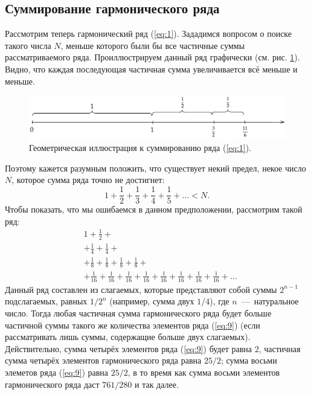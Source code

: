 \documentclass[12pt]{article}
\begin{document}
\subsection{Суммирование гармонического ряда}
Рассмотрим теперь гармонический ряд (\ref{eq:1}). Зададимся вопросом о поиске такого числа $N$, меньше которого были бы все частичные суммы рассматриваемого ряда. Проиллюстрируем данный ряд графически (см. рис. \ref{fig:2}). Видно, что каждая последующая частичная сумма увеличивается всё меньше и меньше.
\begin{figure}[ht]
    \centering
    \includegraphics[width = 1\textwidth]{fig2.png}
    \caption{Геометрическая иллюстрация к суммированию ряда (\ref{eq:1}).}
    \label{fig:2}
\end{figure}
Поэтому кажется разумным положить, что существует некий предел, некое число $N$, которое сумма ряда точно не достигнет:
\begin{equation}\label{eq:7}
    1 + \dfrac{1}{2} + \dfrac13 + \dfrac14 + \dfrac15 + \ldots < N.
\end{equation}
Чтобы показать, что мы ошибаемся в данном предположении, рассмотрим такой ряд:
\begin{equation}\label{eq:9}
    \begin{split}
        &1 + \tfrac12 +\\
        &+ \tfrac14 + \tfrac14 +\\
        &+ \tfrac18+ \tfrac18+ \tfrac18+ \tfrac18 +\\
        &+ \tfrac1{16}+ \tfrac1{16}+ \tfrac1{16}+ \tfrac1{16} + \tfrac1{16}+ \tfrac1{16}+ \tfrac1{16}+ \tfrac1{16} + \ldots
    \end{split}
\end{equation}
Данный ряд составлен из слагаемых, которые представляют собой суммы $2^{n-1}$ подслагаемых, равных ${1}/{2^n}$ (например, сумма двух ${1}/{4}$), где $n$~\----~натуральное число. Тогда любая частичная сумма гармонического ряда будет больше  частичной суммы такого же количества элементов ряда (\ref{eq:9}) (если рассматривать лишь суммы, содержащие больше двух слагаемых). Действительно, сумма четырёх элементов ряда (\ref{eq:9}) будет равна $2$, частичная сумма четырёх элементов гармонического ряда равна $25/{2}$; сумма восьми элеметов ряда (\ref{eq:9}) равна $25/2$, в то время как сумма восьми элементов гармонического ряда даст ${761}/{280}$ и так далее.
\end{document}
